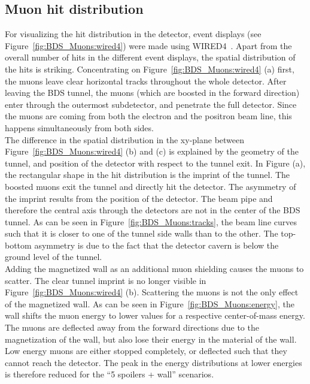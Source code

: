 \subsection{Muon hit distribution}
\label{BDS_Muons:hit_time_dis}
For visualizing the hit distribution in the \sid detector, event displays (see Figure~\ref{fig:BDS_Muons:wired4}) were made using WIRED4~\cite{Wired4}.
Apart from the overall number of hits in the different event displays, the spatial distribution of the hits is striking.
Concentrating on Figure~\ref{fig:BDS_Muons:wired4} (a) first, the muons leave clear horizontal tracks throughout the whole detector.
After leaving the BDS tunnel, the muons (which are boosted in the forward direction) enter \sid through the outermost subdetector, and penetrate the full detector.
Since the muons are coming from both the electron and the positron beam line, this happens simultaneously from both sides.
\\The difference in the spatial distribution in the xy-plane between Figure~\ref{fig:BDS_Muons:wired4} (b) and (c) is explained by the geometry of the tunnel, and position of the detector with respect to the tunnel exit.
In Figure (a), the rectangular shape in the hit distribution is the imprint of the tunnel.
The boosted muons exit the tunnel and directly hit the detector.
The asymmetry of the imprint results from the position of the detector.
The beam pipe and therefore the central axis through the detectors are not in the center of the BDS tunnel.
As can be seen in Figure~\ref{fig:BDS_Muons:tracks}, the beam line curves such that it is closer to one of the tunnel side walls than to the other.
The top-bottom asymmetry is due to the fact that the detector cavern is below the ground level of the tunnel.
\\Adding the magnetized wall as an additional muon shielding causes the muons to scatter.
The clear tunnel imprint is no longer visible in Figure~\ref{fig:BDS_Muons:wired4} (b).
Scattering the muons is not the only effect of the magnetized wall.
As can be seen in Figure~\ref{fig:BDS_Muons:energy}, the wall shifts the muon energy to lower values for a respective center-of-mass energy.
The muons are deflected away from the forward directions due to the magnetization of the wall, but also lose their energy in the material of the wall.
Low energy muons are either stopped completely, or deflected such that they cannot reach the detector. %
The peak in the energy distributions at lower energies is therefore reduced for the ``5 spoilers + wall'' scenarios.
